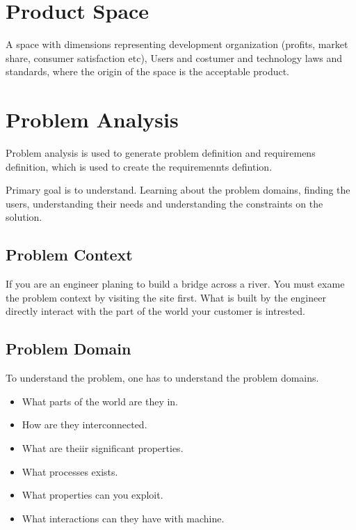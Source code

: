 \documentclass[11pt,a4paper,twocolumn]{book}
\begin{document}
\section{Product Space}

A space with dimensions representing development organization (profits, market share, consumer satisfaction etc), Users and costumer and technology laws and standards, where the origin of the space is the acceptable product.\\

\section{Problem Analysis}

Problem analysis is used to generate problem definition and requiremens definition, which is used to create the requiremennts defintion.

Primary goal is to understand. Learning about the problem domains, finding the users, understanding their needs and understanding the constraints on the solution.\\

\subsection{Problem Context}

If you are an engineer planing to build a bridge across a river. You must exame the problem context by visiting the site first. What is built by the engineer directly interact with the part of the world your customer is intrested.

\subsection{Problem Domain}

To understand the problem, one has to understand the problem domains.

\begin{itemize}
\item What parts of the world are they in.
\item How are they interconnected.
\item What are theiir significant properties.
\item What processes exists.
\item What properties can you exploit.
\item What interactions can they have with machine.
\end{itemize}
\end{document}
